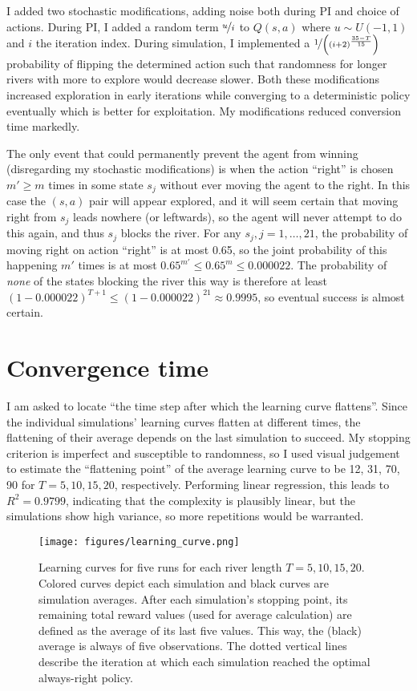 \documentclass{article}
\begin{document}
I added two stochastic modifications, adding noise both during PI and choice of actions. During PI, I added a random term \(\nicefrac{u}{i}\) to \(Q(s,a)\) where \(u \sim U(-1, 1)\) and \(i\) the iteration index. During simulation, I implemented a \(\nicefrac{1}{\left( (i+2)^\frac{35-T}{15} \right)}\) probability of flipping the determined action such that randomness for longer rivers with more to explore would decrease slower. Both these modifications increased exploration in early iterations while converging to a deterministic policy eventually which is better for exploitation. My modifications reduced conversion time markedly.

The only event that could permanently prevent the agent from winning (disregarding my stochastic modifications) is when the action ``right'' is chosen \(m' \ge m\) times in some state \(s_j\) without ever moving the agent to the right. In this case the \((s,a)\) pair will appear explored, and it will seem certain that moving right from \(s_j\) leads nowhere (or leftwards), so the agent will never attempt to do this again, and thus \(s_j\) blocks the river. For any \(s_j, j=1,\ldots,21\), the probability of  moving right on action ``right'' is at most 0.65, so the joint probability of this happening \(m'\) times is at most \(0.65^{m'} \le 0.65^m \le 0.000022\). The probability of \textit{none} of the states blocking the river this way is therefore at least \((1-0.000022)^{T+1} \le (1-0.000022)^{21} \approx 0.9995\), so eventual success is almost certain.

\section*{Convergence time}
I am asked to locate ``the time step after which the learning curve flattens''. Since the individual simulations' learning curves flatten at different times, the flattening of their average depends on the last simulation to succeed. My stopping criterion is imperfect and susceptible to randomness, so I used visual judgement to estimate the ``flattening point'' of the average learning curve to be 12, 31, 70, 90 for \(T=5, 10, 15, 20\), respectively. Performing linear regression, this leads to \(R^2=0.9799\), indicating that the complexity is plausibly linear, but the simulations show high variance, so more repetitions would be warranted.

\clearpage
\begin{figure}[htbp]
    \centering
    \texttt{[image: figures/learning\_curve.png]}
    \caption{Learning curves for five runs for each river length \(T = 5, 10, 15, 20\). Colored curves depict each simulation and black curves are simulation averages. After each simulation's stopping point, its remaining total reward values (used for average calculation) are defined as the average of its last five values. This way, the (black) average is always of five observations. The dotted vertical lines describe the iteration at which each simulation reached the optimal always-right policy.}
    \label{fig:learning_curves}
\end{figure}
\end{document}
